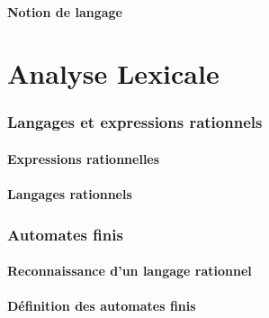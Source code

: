 \subsection{Notion de langage}



 
 
\part{Analyse Lexicale}
 
 
\section{Langages et expressions rationnels}
 
\subsection{Expressions rationnelles}





 
\subsection{Langages rationnels}




 
\section{Automates finis}
 
\subsection{Reconnaissance d'un langage rationnel}





 
\subsection{Définition des automates finis}





 
